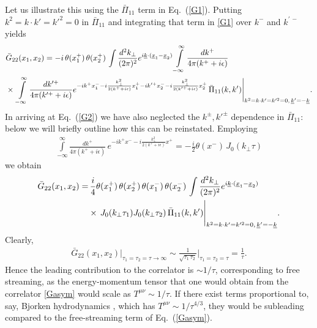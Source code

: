 \documentclass[onecolumn,showpacs,nobibnotes,nofootinbib,12pt,aps,prd,showpacs,notitlepage,nofootinbib,preprintnumbers,amsmath,amssymb]{article}
\def\eq#1{{Eq.~(\ref{#1})}}
\newcommand{\un}[1]{\underline{#1}}
\begin{document}
Let us illustrate this using the ${\bar \Pi}_{11}$ term in
\eq{G1}. Putting $k^2 = k \cdot k' = k'^{2} =0$ in ${\bar \Pi}_{11}$
and integrating that term in \eqref{G1} over $k^-$ and $k^{\prime \,
  -}$ yields
\begin{align}\label{G2}
  & {\bar G}_{22} (x_1, x_2) = -i \, \theta (x_1^+) \, \theta (x_2^+)
  \, \int \frac{d^2 k_{\perp}}{(2\pi)^2} e^{i {\un k} \cdot ({\un x}_1
    - {\un x}_2)} \int\limits_{-\infty}^\infty \frac{d k^+}{4\pi (k^+
    + i \epsilon)} \\ &\times \, \int\limits_{-\infty}^\infty \frac{d
    k'^+}{4\pi (k'^+ + i \epsilon)} e^{-i k^+ x_1^- - i
    \frac{k_\perp^2}{2 (k^+ + i \epsilon)} x_1^+ - i k'^+ x_2^- - i
    \frac{k_\perp^2}{2 (k'^+ + i \epsilon)} x_2^+} \, {\bar \Pi}_{11}
  (k,k') \Bigg|_{k^2 = k \cdot k' = k'^{2} =0, \, \un{k}' = -
    \un{k}}. \notag
\end{align}
In arriving at \eq{G2} we have also neglected the $k^\pm, k'^\pm$
dependence in ${\bar \Pi}_{11}$: below we will briefly outline how
this can be reinstated. Employing
\begin{align}
  \int\limits_{-\infty}^\infty \frac{d k^+}{4\pi (k^+ + i \epsilon)}
  \, e^{-i k^+ x^- - i \frac{k_\perp^2}{2 (k^+ + i \epsilon)} x^+} = -
  \frac{i}{2} \theta (x^-) \, J_0 (k_\perp \tau) \label{Int1}
\end{align}
we obtain
\begin{align}\label{G4}
  \bar G_{22} (x_1, x_2) = & \, \frac{i}{4} \theta (x_1^+) \, \theta
  (x_2^+) \, \theta (x_1^-) \, \theta (x_2^-) \, \int \frac{d^2
    k_{\perp}}{(2\pi)^2} e^{i {\un k} \cdot ({\un x}_1 - {\un x}_2)}
  \notag \\ & \times \, J_0 (k_\perp \tau_1) J_0 (k_\perp \tau_2) \,
  {\bar \Pi}_{11} (k,k') \Bigg|_{k^2 = k \cdot k' = k'^{2} =0, \,
    \un{k}' = - \un{k}}.
\end{align}
Clearly, 
\begin{align}\label{Gasym}
  \bar G_{22} (x_1, x_2) \Bigg|_{\tau_1 = \tau_2 = \tau \to \infty}
  \sim \frac{1}{\sqrt{\tau_1 \, \tau_2}} \Bigg|_{\tau_1 = \tau_2 =
    \tau} = \frac{1}{\tau}.
\end{align}
Hence the leading contribution to the correlator is $\sim 1/\tau$,
corresponding to free streaming, as the energy-momentum tensor that
one would obtain from the correlator \eqref{Gasym} would scale as
$T^{\mu\nu} \sim 1/\tau$. If there exist terms proportional to, say,
Bjorken hydrodynamics \cite{Bjorken:1982qr}, which has $T^{\mu\nu}
\sim 1/\tau^{4/3}$, they would be subleading compared to the
free-streaming term of \eq{Gasym}.
\end{document}
